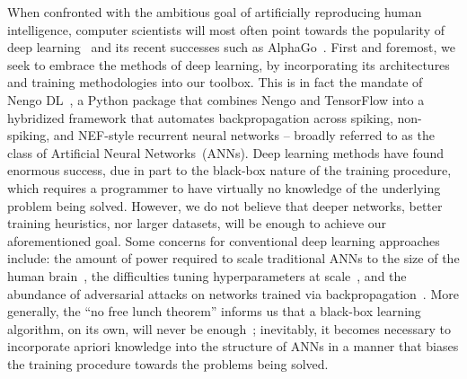When confronted with the ambitious goal of artificially reproducing human intelligence, computer scientists will most often point towards
the popularity of deep learning~\citep{lecun2015deep} and its recent successes such as AlphaGo~\citep{gibney2016google}.
First and foremost, we seek to embrace the methods of deep learning, by incorporating its architectures and training methodologies into our toolbox.
This is in fact the mandate of Nengo DL~\citep{rasmussen2018nengodl}, a Python package that combines Nengo and TensorFlow into a hybridized framework that automates backpropagation across spiking, non-spiking, and NEF-style recurrent neural networks -- broadly referred to as the class of Artificial Neural Networks~(ANNs).
Deep learning methods have found enormous success, due in part to the black-box nature of the training procedure, which requires a programmer to have virtually no knowledge of the underlying problem being solved.
However, we do not believe that deeper networks, better training heuristics, nor larger datasets, will be enough to achieve our aforementioned goal.
Some concerns for conventional deep learning approaches include: the amount of power required to scale traditional ANNs to the size of the human brain~\citep{furber2012build}, the difficulties tuning hyperparameters at scale~\citep{bergstra2015hyperopt}, and the abundance of adversarial attacks on networks trained via backpropagation~\citep{su2019one}.
More generally, the ``no free lunch theorem'' informs us that a black-box learning algorithm, on its own, will never be enough~\citep{wolpert1996lack}; inevitably, it becomes necessary to incorporate apriori knowledge into the structure of ANNs in a manner that biases the training procedure towards the problems being solved.

